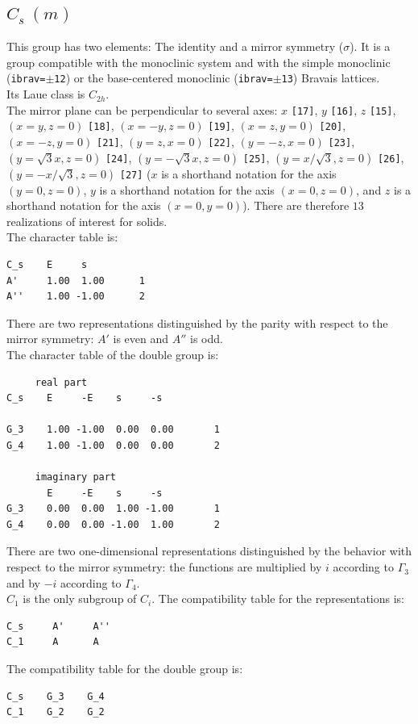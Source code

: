 \documentclass[12pt,a4paper]{article}
\begin{document}
\newpage
\subsection{\color{web-blue}$C_s\ (m)$}
This group has two elements: The identity and a mirror symmetry ($\sigma$).
It is a group compatible with the monoclinic system and with the
simple monoclinic (\texttt{ibrav=$\pm$12}) or the base-centered monoclinic 
(\texttt{ibrav=$\pm$13}) Bravais lattices. \\
Its Laue class is $C_{2h}$. \\
The mirror plane can be perpendicular to several axes:  
$x$ \texttt{[17]}, $y$ \texttt{[16]}, $z$ \texttt{[15]}, 
$(x=y, z=0)$ \texttt{[18]}, 
$(x=-y, z=0)$ \texttt{[19]}, 
$(x=z, y=0)$ \texttt{[20]}, $(x=-z, y=0)$ \texttt{[21]},
$(y=z, x=0)$ \texttt{[22]}, $(y=-z, x=0)$ \texttt{[23]}, 
$(y=\sqrt{3}x, z=0)$ \texttt{[24]}, $(y=-\sqrt{3}x, z=0)$ \texttt{[25]}, 
$(y=x/\sqrt{3}, z=0)$ \texttt{[26]}, $(y=-x/\sqrt{3}, z=0)$ 
\texttt{[27]} ($x$ is a shorthand notation for
the axis $(y=0, z=0)$, $y$ is a shorthand notation for
the axis $(x=0, z=0)$, and $z$ is a shorthand notation for
the axis $(x=0, y=0)$). There are therefore $13$ 
realizations of interest for solids. \\
The character table is:
\begin{verbatim}
C_s    E     s
A'     1.00  1.00      1
A''    1.00 -1.00      2
\end{verbatim}
There are two representations distinguished by the parity
with respect to the mirror symmetry: $A'$ is even and $A''$ is odd.\\
The character table of the double group is:
\begin{verbatim}
     real part
C_s    E     -E    s     -s   
                              
G_3    1.00 -1.00  0.00  0.00       1 
G_4    1.00 -1.00  0.00  0.00       2

     imaginary part
       E     -E    s     -s   
G_3    0.00  0.00  1.00 -1.00       1
G_4    0.00  0.00 -1.00  1.00       2
\end{verbatim}
There are two one-dimensional representations distinguished by the 
behavior with respect to the mirror symmetry: the functions
are multiplied by $i$ according to $\Gamma_3$ and by
$-i$ according to $\Gamma_4$.\\
$C_1$ is the only subgroup of $C_i$. The compatibility table for the
representations is:
\begin{verbatim}
C_s     A'     A''
C_1     A      A
\end{verbatim}
The compatibility table for the double group is:
\begin{verbatim}
C_s    G_3    G_4 
C_1    G_2    G_2
\end{verbatim}
\end{document}
